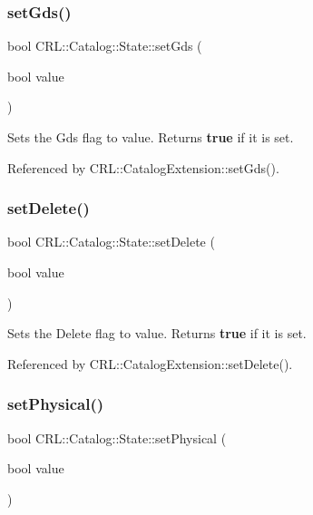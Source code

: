 \subsubsection{\texorpdfstring{set\+Gds()}{setGds()}}
{\footnotesize\ttfamily bool C\+R\+L\+::\+Catalog\+::\+State\+::set\+Gds (\begin{DoxyParamCaption}\item[{bool}]{value }\end{DoxyParamCaption})\hspace{0.3cm}{\ttfamily [inline]}}

Sets the Gds flag to {\ttfamily value}. Returns {\bfseries true} if it is set. 

Referenced by C\+R\+L\+::\+Catalog\+Extension\+::set\+Gds().

\mbox{\label{classCRL_1_1Catalog_1_1State_a53873a1a42083389dfae02b46b3f2de3}} 
\subsubsection{\texorpdfstring{set\+Delete()}{setDelete()}}
{\footnotesize\ttfamily bool C\+R\+L\+::\+Catalog\+::\+State\+::set\+Delete (\begin{DoxyParamCaption}\item[{bool}]{value }\end{DoxyParamCaption})\hspace{0.3cm}{\ttfamily [inline]}}

Sets the Delete flag to {\ttfamily value}. Returns {\bfseries true} if it is set. 

Referenced by C\+R\+L\+::\+Catalog\+Extension\+::set\+Delete().

\mbox{\label{classCRL_1_1Catalog_1_1State_a85a091727c8e7de2b16d01088324de0d}} 
\subsubsection{\texorpdfstring{set\+Physical()}{setPhysical()}}
{\footnotesize\ttfamily bool C\+R\+L\+::\+Catalog\+::\+State\+::set\+Physical (\begin{DoxyParamCaption}\item[{bool}]{value }\end{DoxyParamCaption})\hspace{0.3cm}{\ttfamily [inline]}}

